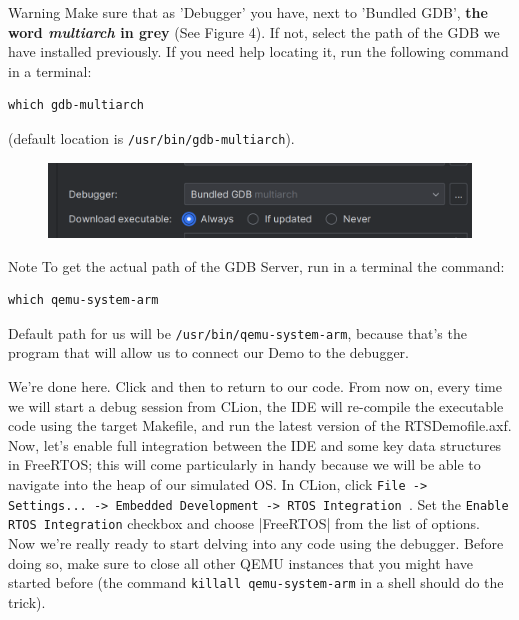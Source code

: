 \documentclass[10pt]{article}
\begin{document}
\begin{Warning}{Warning}
Make sure that as 'Debugger' you have, next to 'Bundled GDB', \textbf{the word \textit{multiarch} in grey} (See Figure 4). If not, select the path of the GDB we have installed previously. If you need help locating it, run the following command in a terminal:
\begin{lstlisting}
which gdb-multiarch
\end{lstlisting}
(default location is \verb|/usr/bin/gdb-multiarch|).

\begin{figure}[H]
    \centering
    \includegraphics[width=0.5\linewidth]{Pictures/1.5.png}
    \caption{}
    \label{fig:3}
\end{figure} 

\end{Warning}

\begin{example}{Note}
To get the actual path of the GDB Server, run in a terminal the command:
\begin{lstlisting}
which qemu-system-arm
\end{lstlisting}

Default path for us will be \verb|/usr/bin/qemu-system-arm|, because that's the program that will allow us to connect our Demo to the debugger.

\end{example}

We're done here. Click  and then  to return to our code. From now on, every time we will start a debug session from CLion, the IDE will re-compile the executable code using the target Makefile, and run the latest version of the RTSDemofile.axf.\\

Now, let's enable full integration between the IDE and some key data structures in FreeRTOS; this will come particularly in handy because we will be able to navigate into the heap of our simulated OS. In CLion, click \verb|File -> Settings... -> Embedded Development -> RTOS Integration |. Set the \verb|Enable RTOS Integration| checkbox and choose \tcboxverb|FreeRTOS| from the list of options.\\

Now we're really ready to start delving into any code using the debugger. Before doing so, make sure to close all other QEMU instances that you might have started before (the command \verb|killall qemu-system-arm| in a shell should do the trick).
\end{document}
